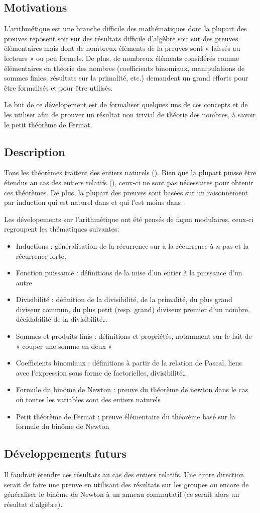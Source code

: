 \subsection{Motivations}

L'arithmétique est une branche difficile des mathématiques dont la plupart des preuves reposent soit sur des résultats difficile d'algèbre soit sur des preuves élémentaires mais dont de nombreux éléments de la preuves sont « laissés au lecteurs » ou peu formels. De plus, de nombreux éléments considérés comme élémentaires en théorie des nombres (coefficients binomiaux, manipulations de sommes finies, résultats sur la primalité, etc.) demandent un grand efforts pour être formalisés et pour être utilisés.

Le but de ce dévelopement est de formaliser quelques uns de ces concepts et de les utiliser afin de prouver un résultat non trivial de théorie des nombres, à savoir le petit théorème de Fermat.

\subsection{Description}

Tous les théorèmes traitent des entiers naturels (). Bien que la plupart puisse être étendus au cas des entiers relatifs (), ceux-ci ne sont pas nécessaires pour obtenir ces théorèmes. De plus, la plupart des preuves sont basées sur un raisonnement par induction qui est naturel dans  et qui l'est moins dans .

Les dévelopements sur l'arithmétique ont été pensés de façon modulaires, ceux-ci regroupent les thématiques suivantes:
\begin{itemize}
 \item Inductions : généralisation de la récurrence sur  à la récurrence à $n$-pas et la récurrence forte.
 \item Fonction puissance : définitions de la mise d'un entier à la puissance d'un autre
 \item Divisibilité : définition de la divisibilité, de la primalité, du plus grand diviseur commun, du plus petit (resp. grand) diviseur premier d'un nombre, décidabilité de la divisibilité\ldots
 \item Sommes et produits finis : définitions et propriétés, notamment sur le fait de « couper une somme en deux »
 \item Coefficients binomiaux : définitions à partir de la relation de Pascal, liens avec l'expression sous forme de factorielles, divisibilité\ldots
 \item Formule du binôme de Newton : preuve du théorème de newton dans le cas où toutes les variables sont des entiers naturels
 \item Petit théorème de Fermat : preuve élémentaire du théorème basé sur la formule du binôme de Newton
\end{itemize}

\subsection{Développements futurs}

Il faudrait étendre ces résultats au cas des entiers relatifs. Une autre direction serait de faire une preuve en utilisant des résultats sur les groupes ou encore de généraliser le binôme de Newton à un anneau commutatif (ce serait alors un résultat d'algèbre).

